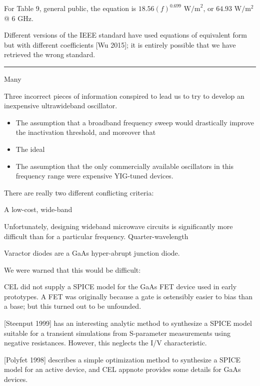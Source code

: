 \documentclass[paper.tex]{subfiles}
\begin{document}
For Table 9, general public, the equation is $18.56 (f)^{0.699} \text{ W/m}^2$, or $64.93 \text{ W}/\text{m}^2$ @ 6 GHz. 

Different versions of the IEEE standard have used equations of equivalent form but with different coefficients [Wu 2015]; it is entirely possible that we have retrieved the wrong standard.

\rule{\linewidth}{0.2pt}



Many 

Three incorrect pieces of information conspired to lead us to try to develop an inexpensive ultrawideband oscillator.

\begin{itemize}
	\item The assumption that a broadband frequency sweep would drastically improve the inactivation threshold, and moreover that 
	\item The ideal 
	\item The assumption that the only commercially available oscillators in this frequency range were expensive YIG-tuned devices.
\end{itemize}

There are really two different conflicting criteria: 

A low-cost, wide-band

Unfortunately, designing wideband microwave circuits is significantly more difficult than for a particular frequency. Quarter-wavelength 

Varactor diodes are a GaAs hyper-abrupt junction diode.

We were warned that this would be difficult: 



CEL did not supply a SPICE model for the GaAs FET device used in early prototypes. A FET was originally because a gate is ostensibly easier to bias than a base; but this turned out to be unfounded.

[Steenput 1999] has an interesting analytic method to synthesize a SPICE model suitable for a transient simulations from S-parameter measurements using negative resistances. However, this neglects the I/V characteristic. 

[Polyfet 1998] describes a simple optimization method to synthesize a SPICE model for an active device, and CEL appnote provides some details for GaAs devices.
\end{document}
